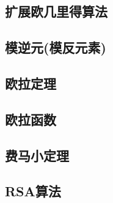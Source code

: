 \documentclass{article}
\begin{document}
\subsection{扩展欧几里得算法}   
\subsection{模逆元(模反元素)}   
\subsection{欧拉定理}   
\subsection{欧拉函数}   
\subsection{费马小定理}   
\subsection{RSA算法}   
 

 

\end{document}
